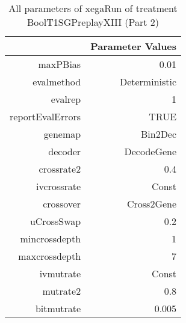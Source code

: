 \begin{table}[ht]
\centering
\begin{tabular}{rr}
  \hline
 & Parameter Values \\ 
  \hline
maxPBias & 0.01 \\ 
  evalmethod & Deterministic \\ 
  evalrep & 1 \\ 
  reportEvalErrors & TRUE \\ 
  genemap & Bin2Dec \\ 
  decoder & DecodeGene \\ 
  crossrate2 & 0.4 \\ 
  ivcrossrate & Const \\ 
  crossover & Cross2Gene \\ 
  uCrossSwap & 0.2 \\ 
  mincrossdepth & 1 \\ 
  maxcrossdepth & 7 \\ 
  ivmutrate & Const \\ 
  mutrate2 & 0.8 \\ 
  bitmutrate & 0.005 \\ 
   \hline
\end{tabular}
\caption{ All parameters of xegaRun of treatment BoolT1SGPreplayXIII 
 (Part 2)} 
\end{table}
